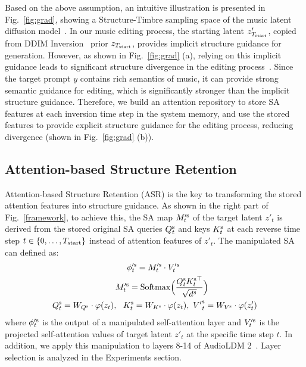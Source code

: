 Based on the above assumption, an intuitive illustration is presented in Fig.~\ref{fig:grad}, showing a Structure-Timbre sampling space of the music latent diffusion model~\cite{audioldm, audioldm2}. In our music editing process, the starting latent $z'_{T_{\rm start}}$, copied from DDIM Inversion~\cite{song2020ddim} prior $z_{T_{\rm start}}$, provides implicit structure guidance for generation. However, as shown in Fig.~\ref{fig:grad} (a), relying on this implicit guidance leads to significant structure divergence in the editing process~\cite{song2020ddim, mou2023dragon, tumanyan2023plug}. Since the target prompt $y$ contains rich semantics of music, it can provide strong semantic guidance for editing, which is significantly stronger than the implicit structure guidance. Therefore, we build an attention repository to store SA features at each inversion time step in the system memory, and use the stored features to provide explicit structure guidance for the editing process, reducing divergence (shown in Fig.~\ref{fig:grad} (b)).

\subsection{Attention-based Structure Retention} Attention-based Structure Retention (ASR) is the key to transforming the stored attention features into structure guidance. As shown in the right part of Fig.~\ref{framework}, to achieve this, the SA map $M'^{\rm s}_t$ of the target latent $z'_t$ is derived from the stored original SA queries $Q^{\rm s}_t$ and keys $K^{\rm s}_t$ at each reverse time step $t\in \{0,\dots,T_{\rm start}\}$ instead of attention features of $z'_t$. The manipulated SA can defined as:
\begin{align}
	\phi'^{\rm s}_t = M'^{\rm s}_t& \cdot V'^s_t \\
	M'^{\rm s}_t = {\rm Softm}&{\rm ax} \Big( \frac{Q^{\rm s}_t{K^{\rm s}_t}^\top}{\sqrt{d^s}} \Big) \\
	Q^{\rm s}_t=W_{Q^{\rm s}}\cdot \varphi(z_t),\ \ K^{\rm s}_t=W_{K^{\rm s}}&\cdot \varphi(z_t),\ {V'}^{\rm s}_t=W_{V^{\rm s}}\cdot \varphi(z'_t)
\end{align}
where $\phi'^{\rm s}_t$ is the output of a manipulated self-attention layer and $V'^{\rm s}_t$ is the projected self-attention values of target latent $z'_t$ at the specific time step $t$. In addition, we apply this manipulation to layers 8-14 of AudioLDM 2~\cite{audioldm2}. Layer selection is analyzed in the Experiments section.

